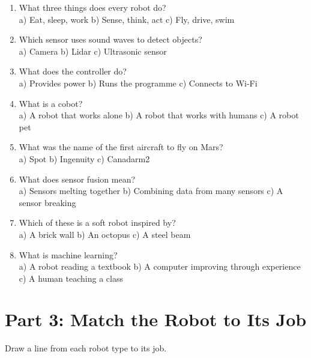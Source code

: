 \begin{enumerate}
  \item What three things does every robot do?\\
    a) Eat, sleep, work \quad b) Sense, think, act \quad c) Fly, drive, swim

  \item Which sensor uses sound waves to detect objects?\\
    a) Camera \quad b) Lidar \quad c) Ultrasonic sensor

  \item What does the controller do?\\
    a) Provides power \quad b) Runs the programme \quad c) Connects to Wi-Fi

  \item What is a cobot?\\
    a) A robot that works alone \quad b) A robot that works with humans \quad c) A robot pet

  \item What was the name of the first aircraft to fly on Mars?\\
    a) Spot \quad b) Ingenuity \quad c) Canadarm2

  \item What does sensor fusion mean?\\
    a) Sensors melting together \quad b) Combining data from many sensors \quad c) A sensor breaking

  \item Which of these is a soft robot inspired by?\\
    a) A brick wall \quad b) An octopus \quad c) A steel beam

  \item What is machine learning?\\
    a) A robot reading a textbook \quad b) A computer improving through experience \quad c) A human teaching a class
\end{enumerate}

\sectionrule

\section*{Part 3: Match the Robot to Its Job}

Draw a line from each robot type to its job.

